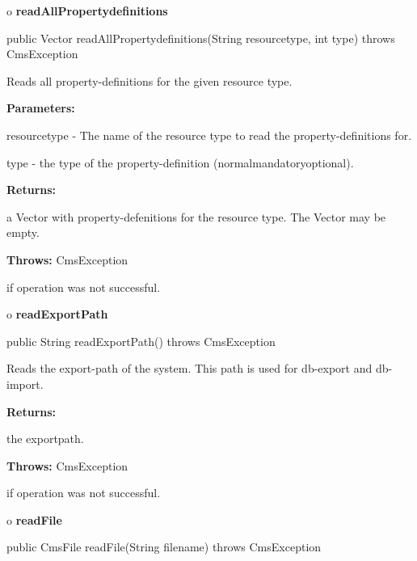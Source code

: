 o {\bf readAllPropertydefinitions} 

\begin{PRE}
 public Vector readAllPropertydefinitions(String resourcetype,
                                          int type) throws CmsException
\end{PRE}

\begin{description}
\htmlDD Reads all property-definitions for the given resource type. 

\begin{description}
\item {\bf Parameters:}  

resourcetype - The name of the resource type to read the property-definitions
for.  

type - the type of the property-definition
(normal{\htmlBar}mandatory{\htmlBar}optional).  
\item {\bf Returns:}  

a Vector with property-defenitions for the resource type. The Vector may be
empty.  
\item {\bf Throws:} CmsException  

if operation was not successful.  
\end{description}

\end{description}

o {\bf readExportPath} 

\begin{PRE}
 public String readExportPath() throws CmsException
\end{PRE}

\begin{description}
\htmlDD Reads the export-path of the system. This path is used for db-export
and db-import. 

\begin{description}
\item {\bf Returns:}  

the exportpath.  
\item {\bf Throws:} CmsException  

if operation was not successful.  
\end{description}

\end{description}

o {\bf readFile} 

\begin{PRE}
 public CmsFile readFile(String filename) throws CmsException
\end{PRE}

